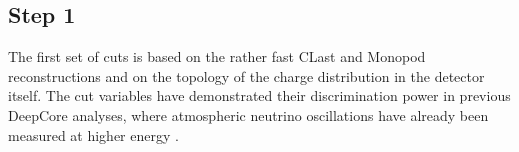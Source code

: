 
\subsection{Step 1}
\label{sec:cuts_step1}

The first set of cuts is based on the rather fast CLast and Monopod
reconstructions and on the topology of the charge distribution in the detector
itself. The cut variables have demonstrated their discrimination power in
previous DeepCore analyses, where atmospheric neutrino oscillations have already
been measured at higher energy \cite{DCosc}.

